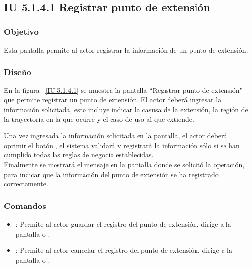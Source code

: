 \newpage 
\subsection{IU 5.1.4.1 Registrar punto de extensión}

\subsubsection{Objetivo}
	
	Esta pantalla permite al actor registrar la información de un punto de extensión.

\subsubsection{Diseño}

    En la figura ~\ref{IU 5.1.4.1} se muestra la pantalla ``Registrar punto de extensión'' que permite registrar un punto de extensión. El actor deberá ingresar la información solicitada, esto incluye indicar la casusa de la extensión, la región de la trayectoria en la que ocurre y el caso de uso al que extiende.
    
    Una vez ingresada la información solicitada en la pantalla, el actor deberá oprimir el botón 
    , el sistema validará y registrará la información sólo si se han cumplido todas las reglas de negocio establecidas.  \\
    
    Finalmente se mostrará el mensaje  en la pantalla donde se solicitó la operación, para indicar que la información del punto de extensión se ha registrado correctamente.        




\subsubsection{Comandos}
\begin{itemize}
	\item {}: Permite al actor guardar el registro del punto de extensión, dirige a la pantalla  o .
	\item {}: Permite al actor cancelar el registro del punto de extensión, dirige a la pantalla  o .
\end{itemize}

